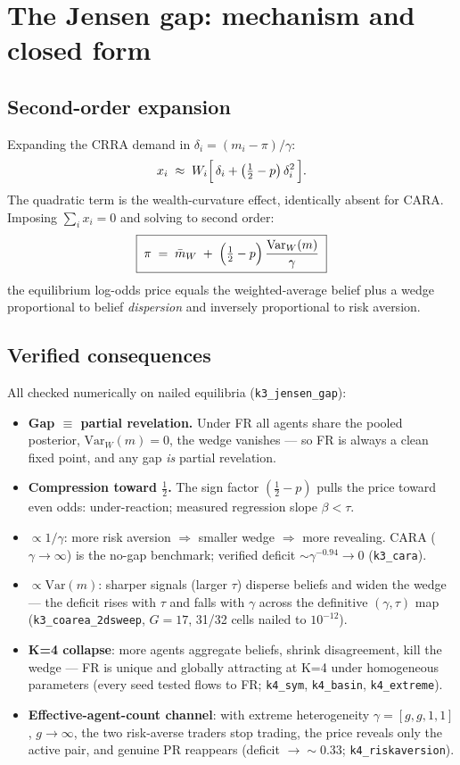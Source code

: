 \documentclass[11pt]{report}
\begin{document}
\chapter{The Jensen gap: mechanism and closed form}

\section{Second-order expansion}
Expanding the CRRA demand in $\delta_i = (m_i - \pi)/\gamma$:
\[
  x_i \;\approx\; W_i\Bigl[\, \delta_i + \bigl(\tfrac12 - p\bigr)\,\delta_i^2 \,\Bigr].
\]
The quadratic term is the wealth-curvature effect, identically absent
for CARA. Imposing $\sum_i x_i = 0$ and solving to second order:
\[
  \boxed{\;\pi \;=\; \bar m_W \;+\;
  \Bigl(\tfrac12 - p\Bigr)\,\frac{\mathrm{Var}_W(m)}{\gamma}\;}
\]
the equilibrium log-odds price equals the weighted-average belief plus a
wedge proportional to belief \emph{dispersion} and inversely proportional
to risk aversion.

\section{Verified consequences}
All checked numerically on nailed equilibria (\texttt{k3\_jensen\_gap}):
\begin{itemize}\itemsep2pt
  \item \textbf{Gap $\equiv$ partial revelation.} Under FR all agents
        share the pooled posterior, $\mathrm{Var}_W(m) = 0$, the wedge
        vanishes --- so FR is always a clean fixed point, and any gap
        \emph{is} partial revelation.
  \item \textbf{Compression toward $\tfrac12$.} The sign factor
        $(\tfrac12 - p)$ pulls the price toward even odds:
        under-reaction; measured regression slope $\beta < \tau$.
  \item \textbf{$\propto 1/\gamma$}: more risk aversion $\Rightarrow$
        smaller wedge $\Rightarrow$ more revealing. CARA
        ($\gamma \to \infty$) is the no-gap benchmark; verified
        deficit $\sim \gamma^{-0.94} \to 0$ (\texttt{k3\_cara}).
  \item \textbf{$\propto \mathrm{Var}(m)$}: sharper signals (larger
        $\tau$) disperse beliefs and widen the wedge --- the deficit
        rises with $\tau$ and falls with $\gamma$ across the definitive
        $(\gamma, \tau)$ map (\texttt{k3\_coarea\_2dsweep}, $G{=}17$,
        31/32 cells nailed to $10^{-12}$).
  \item \textbf{K=4 collapse}: more agents aggregate beliefs, shrink
        disagreement, kill the wedge --- FR is unique and globally
        attracting at K=4 under homogeneous parameters (every seed
        tested flows to FR; \texttt{k4\_sym}, \texttt{k4\_basin},
        \texttt{k4\_extreme}).
  \item \textbf{Effective-agent-count channel}: with extreme
        heterogeneity $\gamma = [g, g, 1, 1]$, $g \to \infty$, the two
        risk-averse traders stop trading, the price reveals only the
        active pair, and genuine PR reappears (deficit $\to \sim 0.33$;
        \texttt{k4\_riskaversion}).
\end{itemize}
\end{document}
